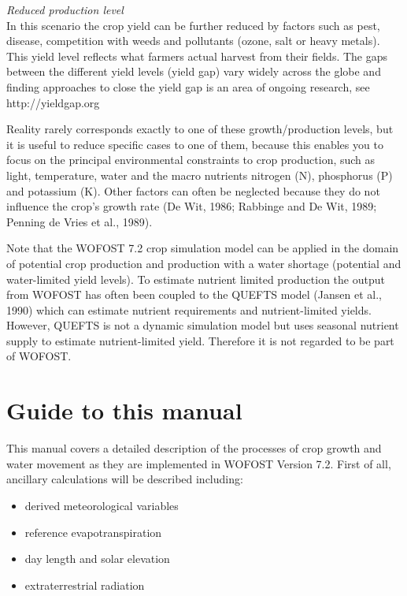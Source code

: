 {\it Reduced production level\/}\\
In this scenario the crop yield can be further reduced by factors such as pest, disease, competition with weeds
and pollutants (ozone, salt or heavy metals). This yield level reflects what farmers actual
harvest from their fields. The gaps between the different yield levels (yield gap) vary widely
across the globe and finding approaches to close the yield gap is an area of ongoing research,
see http://yieldgap.org

Reality rarely corresponds exactly to one of these growth/production levels, but it is 
useful to reduce specific cases to one of them, because this enables you to focus on the 
principal environmental constraints to crop production, such as light, temperature, 
water and the macro nutrients nitrogen (N), phosphorus (P) and potassium (K). Other 
factors can often be neglected because they do not influence the crop's growth rate 
(De Wit, 1986; Rabbinge and De Wit, 1989; Penning de Vries et al., 1989).

Note that the WOFOST 7.2 crop simulation model can be applied in the domain of potential crop
production and production with a water shortage (potential and water-limited yield levels). 
To estimate nutrient limited production the output from WOFOST has often been coupled to the QUEFTS
model (Jansen et al., 1990) which can estimate nutrient requirements and nutrient-limited yields.
However, QUEFTS is not a dynamic simulation model but uses seasonal nutrient supply to estimate
nutrient-limited yield. Therefore it is not regarded to be part of WOFOST.

\section{Guide to this manual}

This manual covers a detailed description of the processes of crop growth and water movement as they are
implemented in WOFOST Version 7.2. First of all, ancillary calculations will be described including:
\begin{itemize}
	\item derived meteorological variables
	\item reference evapotranspiration
	\item day length and solar elevation
	\item extraterrestrial radiation
\end{itemize}

